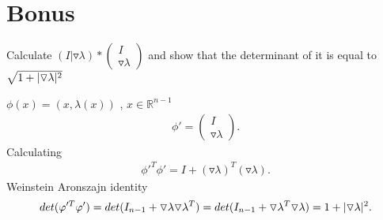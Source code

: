\section{Bonus}
\begin{question}
  Calculate $(I | \triangledown \lambda ) * \begin{pmatrix} I \\ \triangledown \lambda  \end{pmatrix} $ and show that the determinant of it is equal to $\sqrt{1+\lvert\triangledown \lambda \rvert^2} $
\end{question}
\begin{solution}
$\phi(x) =  (x,\lambda(x))$ , $x \in  \mathbb{R}^{n-1} $  
\begin{align*}
  \phi' =  \begin{pmatrix} I \\
  \triangledown \lambda\end{pmatrix} 
.\end{align*}
Calculating 
\begin{align*}
  \phi'^{T}\phi'  = I + (\triangledown \lambda)^{T}(\triangledown \lambda)  
.\end{align*}
Weinstein Aronszajn identity
\begin{align*}
  det(\varphi'^{T}\varphi' ) = det(I_{n-1} + \triangledown \lambda \triangledown \lambda ^{T}  ) = det(I_{n-1} + \triangledown \lambda ^{T}\triangledown \lambda  ) = 1 + \lvert\triangledown \lambda \rvert^2
.\end{align*}
\end{solution}
